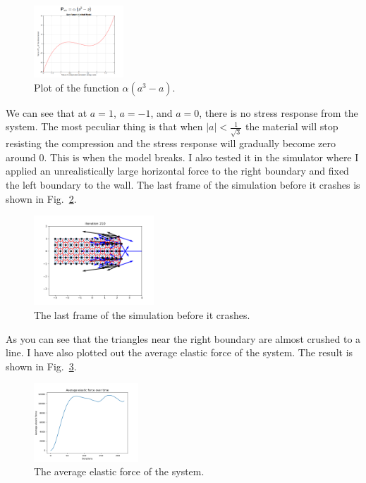 \documentclass[acmtog]{acmart}
\begin{document}
\begin{figure}[H]
  \centering
  \includegraphics[width=0.30\textwidth]{images/cubic.png}
  \caption{Plot of the function $\alpha (a^3 - a)$.}
  \label{fig:cubic}
\end{figure}

We can see that at $a=1$, $a=-1$, and $a=0$, there is no stress response from the system. The most peculiar thing is that when $|a| < \frac{1}{\sqrt{3}}$ the material will stop resisting the compression and the stress response will gradually become zero around 0. This is when the model breaks. I also tested it in the simulator where I applied an unrealistically large horizontal force to the right boundary and fixed the left boundary to the wall. The last frame of the simulation before it crashes is shown in Fig.~\ref{fig:explode}.

\begin{figure}[H]
  \centering
  \includegraphics[width=0.40\textwidth]{images/explode.png}
  \caption{The last frame of the simulation before it crashes.}
  \label{fig:explode}
\end{figure}

As you can see that the triangles near the right boundary are almost crushed to a line. I have also plotted out the average elastic force of the system. The result is shown in Fig.~\ref{fig:explode2}.

\begin{figure}[H]
  \centering
  \includegraphics[width=0.35\textwidth]{images/explode2.png}
  \caption{The average elastic force of the system.}
  \label{fig:explode2}
\end{figure}
\end{document}
